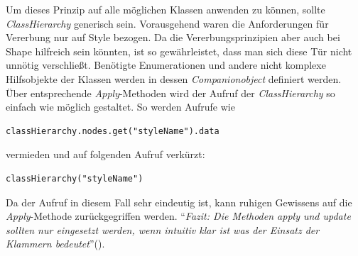 Um dieses Prinzip auf alle möglichen Klassen anwenden zu können, sollte \textit{ClassHierarchy} generisch sein. Vorausgehend waren die Anforderungen für Vererbung nur auf Style bezogen. Da die Vererbungsprinzipien aber auch bei Shape hilfreich sein könnten, ist so gewährleistet, dass man sich diese Tür nicht unnötig verschließt. 
Benötigte Enumerationen und andere nicht komplexe Hilfsobjekte der Klassen werden in dessen \textit{Companionobject} definiert werden. 
Über entsprechende \textit{Apply}-Methoden wird der Aufruf der \textit{ClassHierarchy} so einfach wie möglich gestaltet. So werden Aufrufe wie
\begin{lstlisting}[style=scala, aboveskip=0pt]
classHierarchy.nodes.get("styleName").data
\end{lstlisting}
vermieden und auf folgenden Aufruf verkürzt:
\begin{lstlisting}[style=scala, aboveskip=0pt]
classHierarchy("styleName")
\end{lstlisting}
Da der Aufruf in diesem Fall sehr eindeutig ist, kann ruhigen Gewissens auf die \textit{Apply}-Methode zurückgegriffen werden. "`\textit{Fazit: Die Methoden apply und update sollten nur eingesetzt werden, wenn intuitiv klar ist was der Einsatz der Klammern bedeutet}"'(\citet[p. 76]{esser:scala}).


